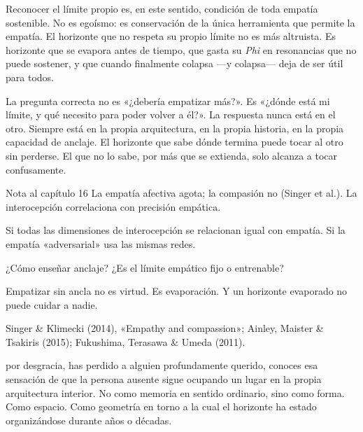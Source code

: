 Reconocer el límite propio es, en este sentido, condición de toda empatía sostenible. No es egoísmo: es conservación de la única herramienta que permite la empatía. El horizonte que no respeta su propio límite no es más altruista. Es horizonte que se evapora antes de tiempo, que gasta su \emph{Phi} en resonancias que no puede sostener, y que cuando finalmente colapsa —y colapsa— deja de ser útil para todos.

La pregunta correcta no es «¿debería empatizar más?». Es «¿dónde está mi límite, y qué necesito para poder volver a él?». La respuesta nunca está en el otro. Siempre está en la propia arquitectura, en la propia historia, en la propia capacidad de anclaje. El horizonte que sabe dónde termina puede tocar al otro sin perderse. El que no lo sabe, por más que se extienda, solo alcanza a tocar confusamente.

\begin{notacap}{Nota al capítulo 16}
 La empatía afectiva agota; la compasión no (Singer et al.). La interocepción correlaciona con precisión empática.

 Si todas las dimensiones de interocepción se relacionan igual con empatía. Si la empatía «adversarial» usa las mismas redes.

 ¿Cómo enseñar anclaje? ¿Es el límite empático fijo o entrenable?

 Empatizar sin ancla no es virtud. Es evaporación. Y un horizonte evaporado no puede cuidar a nadie.

 Singer \& Klimecki (2014), «Empathy and compassion»; Ainley, Maister \& Tsakiris (2015); Fukushima, Terasawa \& Umeda (2011).
\end{notacap}
\noindent {} por desgracia, has perdido a alguien profundamente querido, conoces esa sensación de que la persona ausente sigue ocupando un lugar en la propia arquitectura interior. No como memoria en sentido ordinario, sino como forma. Como espacio. Como geometría en torno a la cual el horizonte ha estado organizándose durante años o décadas.

